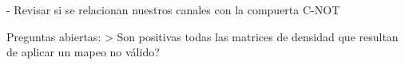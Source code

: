 - Revisar si se relacionan nuestros canales con la compuerta C-NOT

Preguntas abiertas:
> Son positivas todas las matrices de densidad que resultan de aplicar un mapeo no válido?
